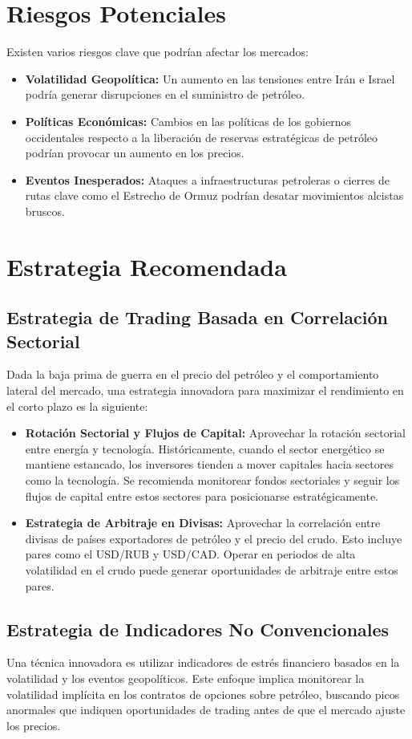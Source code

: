 \documentclass{article}
\begin{document}
\section{Riesgos Potenciales}
Existen varios riesgos clave que podrían afectar los mercados:
\begin{itemize}
    \item \textbf{Volatilidad Geopolítica:} Un aumento en las tensiones entre Irán e Israel podría generar disrupciones en el suministro de petróleo.
    \item \textbf{Políticas Económicas:} Cambios en las políticas de los gobiernos occidentales respecto a la liberación de reservas estratégicas de petróleo podrían provocar un aumento en los precios.
    \item \textbf{Eventos Inesperados:} Ataques a infraestructuras petroleras o cierres de rutas clave como el Estrecho de Ormuz podrían desatar movimientos alcistas bruscos.
\end{itemize}

\section{Estrategia Recomendada}
\subsection{Estrategia de Trading Basada en Correlación Sectorial}
Dada la baja prima de guerra en el precio del petróleo y el comportamiento lateral del mercado, una estrategia innovadora para maximizar el rendimiento en el corto plazo es la siguiente:
\begin{itemize}
    \item \textbf{Rotación Sectorial y Flujos de Capital:} Aprovechar la rotación sectorial entre energía y tecnología. Históricamente, cuando el sector energético se mantiene estancado, los inversores tienden a mover capitales hacia sectores como la tecnología. Se recomienda monitorear fondos sectoriales y seguir los flujos de capital entre estos sectores para posicionarse estratégicamente.
    \item \textbf{Estrategia de Arbitraje en Divisas:} Aprovechar la correlación entre divisas de países exportadores de petróleo y el precio del crudo. Esto incluye pares como el USD/RUB y USD/CAD. Operar en periodos de alta volatilidad en el crudo puede generar oportunidades de arbitraje entre estos pares.
\end{itemize}

\subsection{Estrategia de Indicadores No Convencionales}
Una técnica innovadora es utilizar indicadores de estrés financiero basados en la volatilidad y los eventos geopolíticos. Este enfoque implica monitorear la volatilidad implícita en los contratos de opciones sobre petróleo, buscando picos anormales que indiquen oportunidades de trading antes de que el mercado ajuste los precios.
\end{document}
